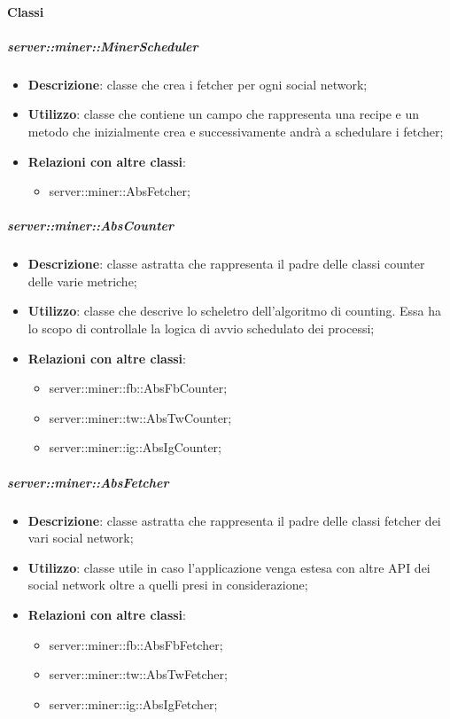 \paragraph{Classi} %
		\subparagraph{server::miner::MinerScheduler} %
		\label{subp:server_miner_MinerScheduler}
			\begin{itemize}
				\item \textbf{Descrizione}: classe che crea i fetcher per ogni social network;
				\item \textbf{Utilizzo}: classe che contiene un campo che rappresenta una recipe e un metodo che inizialmente crea e successivamente andrà a schedulare i fetcher;
				\item \textbf{Relazioni con altre classi}:
					\begin{itemize}
						\item server::miner::AbsFetcher;
					\end{itemize}
			\end{itemize}

		\subparagraph{server::miner::AbsCounter} %
		\label{subp:server_miner_AbsCounter}
			\begin{itemize}
				\item \textbf{Descrizione}: classe astratta che rappresenta il padre delle classi counter delle varie metriche;
				\item \textbf{Utilizzo}: classe che descrive lo scheletro dell'algoritmo di counting. Essa ha lo scopo di controllale la logica di avvio schedulato dei processi;
				\item \textbf{Relazioni con altre classi}:
					\begin{itemize}
						\item server::miner::fb::AbsFbCounter;
						\item server::miner::tw::AbsTwCounter;
						\item server::miner::ig::AbsIgCounter;
					\end{itemize}
			\end{itemize}

		\subparagraph{server::miner::AbsFetcher} %
		\label{subp:server_miner_AbsFetcher}
				\begin{itemize}
				\item \textbf{Descrizione}: classe astratta che rappresenta il padre delle classi fetcher dei vari social network;
				\item \textbf{Utilizzo}: classe utile in caso l'applicazione venga estesa con altre API dei social network oltre a quelli presi in considerazione;
				\item \textbf{Relazioni con altre classi}:
					\begin{itemize}
						\item server::miner::fb::AbsFbFetcher;
						\item server::miner::tw::AbsTwFetcher;
						\item server::miner::ig::AbsIgFetcher;
					\end{itemize}
			\end{itemize}

